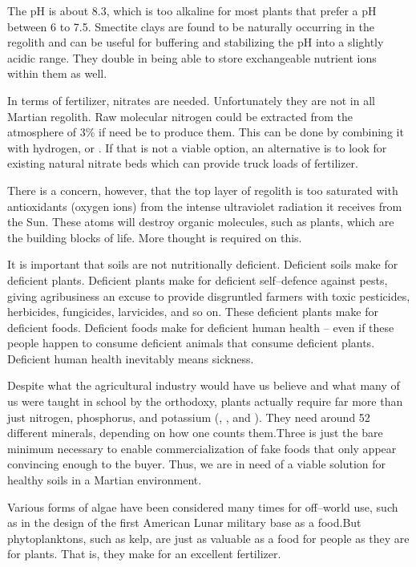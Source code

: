 The pH is about 8.3, which is too alkaline for most plants that prefer a pH between 6 to 7.5. Smectite clays are found to be naturally occurring in the regolith and can be useful for buffering and stabilizing the pH into a slightly acidic range. They double in being able to store exchangeable nutrient ions within them as well.

In terms of fertilizer, nitrates are needed. Unfortunately they are not in all Martian regolith. Raw molecular nitrogen could be extracted from the atmosphere of 3\% if need be to produce them. This can be done by combining it with hydrogen, or . If that is not a viable option, an alternative is to look for existing natural nitrate beds which can provide truck loads of fertilizer.

There is a concern, however, that the top layer of regolith is too saturated with antioxidants (oxygen ions) from the intense ultraviolet radiation it receives from the Sun. These atoms will destroy organic molecules, such as plants, which are the building blocks of life. More thought is required on this.

It is important that soils are not nutritionally deficient. Deficient soils make for deficient plants. Deficient plants make for deficient self--defence against pests, giving agribusiness an excuse to provide disgruntled farmers with toxic pesticides, herbicides, fungicides, larvicides, and so on. These deficient plants make for deficient foods. Deficient foods make for deficient human health  -- even if these people happen to consume deficient animals that consume deficient plants. Deficient human health inevitably means sickness.

Despite what the agricultural industry would have us believe and what many of us were taught in school by the orthodoxy, plants actually require far more than just nitrogen, phosphorus, and potassium (, , and ). They need around 52 different minerals, depending on how one counts them. Three is just the bare minimum necessary to enable commercialization of fake foods that only appear convincing enough to the buyer. Thus, we are in need of a viable solution for healthy soils in a Martian environment.

Various forms of algae have been considered many times for off--world use, such as in the design of the first American Lunar military base as a food. But phytoplanktons, such as kelp, are just as valuable as a food for people as they are for plants. That is, they make for an excellent fertilizer.

